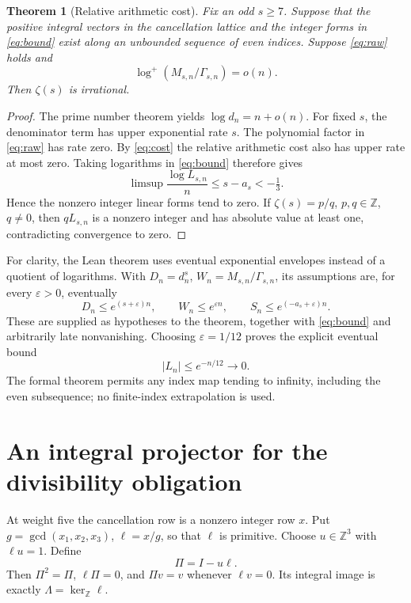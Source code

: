 \documentclass[11pt]{article}
\newtheorem{theorem}{Theorem}[section]
\theoremstyle{remark}
\newcommand{\Z}{\mathbb Z}
\begin{document}
\begin{theorem}[Relative arithmetic cost]
Fix an odd \(s\ge7\). Suppose that the positive integral vectors
in the cancellation lattice and the integer forms in
\eqref{eq:bound} exist along an unbounded sequence of even indices.
Suppose \eqref{eq:raw} holds and
\begin{equation}
 \log^+(M_{s,n}/\Gamma_{s,n})=o(n).
 \label{eq:cost}
\end{equation}
Then \(\zeta(s)\) is irrational.
\end{theorem}
\begin{proof}
The prime number theorem yields \(\log d_n=n+o(n)\).
For fixed \(s\), the denominator term has upper exponential rate \(s\).
The polynomial factor in \eqref{eq:raw} has rate zero.
By \eqref{eq:cost} the relative arithmetic cost also has upper rate
at most zero. Taking logarithms in \eqref{eq:bound} therefore gives
\[
 \limsup\frac{\log L_{s,n}}n\le s-a_s<-\tfrac13.
\]
Hence the nonzero integer linear forms tend to zero.
If \(\zeta(s)=p/q\), \(p,q\in\Z\), \(q\ne0\), then
\(qL_{s,n}\) is a nonzero integer and has absolute value at least one,
contradicting convergence to zero.
\end{proof}

For clarity, the Lean theorem uses eventual exponential envelopes
instead of a quotient of logarithms. With \(D_n=d_n^s\),
\(W_n=M_{s,n}/\Gamma_{s,n}\), its assumptions are, for every
\(\varepsilon>0\), eventually
\[
 D_n\le e^{(s+\varepsilon)n},\qquad
 W_n\le e^{\varepsilon n},\qquad
 S_n\le e^{(-a_s+\varepsilon)n}.
\]
These are supplied as hypotheses to the theorem, together with
\eqref{eq:bound} and arbitrarily late nonvanishing. Choosing
\(\varepsilon=1/12\) proves the explicit eventual bound
\[
 |L_n|\le e^{-n/12}\longrightarrow0.
\]
The formal theorem permits any index map tending to infinity, including
the even subsequence; no finite-index extrapolation is used.

\section{An integral projector for the divisibility obligation}
At weight five the cancellation row is a nonzero integer row \(x\).
Put \(g=\gcd(x_1,x_2,x_3)\), \(\ell=x/g\), so that \(\ell\) is primitive.
Choose \(u\in\Z^3\) with \(\ell u=1\). Define
\[
 \Pi=I-u\ell.
\]
Then \(\Pi^2=\Pi\), \(\ell\Pi=0\), and
\(\Pi v=v\) whenever \(\ell v=0\). Its integral image is exactly
\(\Lambda=\ker_\Z\ell\).
\end{document}
